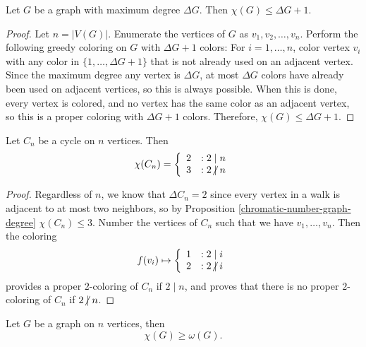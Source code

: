\begin{prop}\label{chromatic-number-graph-degree}
    Let $G$ be a graph with maximum degree $\Delta G$. Then $\chi(G) \leq \Delta G + 1$.
\end{prop}

\begin{proof}
    Let $n = |V(G)|$. Enumerate the vertices of $G$ as $v_1, v_2, \ldots, v_n$. Perform the following greedy coloring on $G$ with $\Delta G + 1$ colors: For $i = 1, \ldots, n$, color vertex $v_i$ with any color in $\{1, \ldots, \Delta G+1\}$ that is not already used on an adjacent vertex. Since the maximum degree any vertex is $\Delta G$, at most $\Delta G$ colors have already been used on adjacent vertices, so this is always possible. When this is done, every vertex is colored, and no vertex has the same color as an adjacent vertex, so this is a proper coloring with $\Delta G + 1$ colors. Therefore, $\chi(G) \leq \Delta G + 1$.
\end{proof}

\begin{prop}\label{cycle-chromatic-parity}
    Let $C_n$ be a cycle on $n$ vertices. Then
    \[\chi(C_n) = \left\{
        \begin{array}{lr}
            2 & : 2 \mid n \\
            3 & : 2 \centernot\mid n
        \end{array}\right.\]
\end{prop}

\begin{proof}
    Regardless of $n$, we know that $\Delta C_n = 2$ since every vertex in a walk is adjacent to at most two neighbors, so by Proposition \ref{chromatic-number-graph-degree} $\chi(C_n) \leq 3$. Number the vertices of $C_n$ such that we have $v_1, \ldots, v_n$. Then the coloring
    \[f(v_i) \mapsto \left\{
        \begin{array}{lr}
            1 & : 2 \mid i \\
            2 & : 2 \centernot\mid i
        \end{array}\right.\] provides a proper $2$-coloring of $C_n$ if $2 \mid n$, and proves that there is no proper $2$-coloring of $C_n$ if $2 \centernot\mid n$.
\end{proof}

\begin{prop}\label{chromatic-cliques-independent-sets}
    Let $G$ be a graph on $n$ vertices, then
    \[\chi(G) \geq \omega(G).\]
\end{prop}

